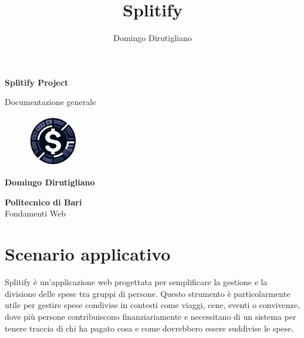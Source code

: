 \documentclass[11pt]{article}
\title{Splitify}
\author{Domingo Dirutigliano}
\begin{document}
\begin{titlepage}
   \begin{center}
       \vspace*{1cm}

       \LARGE{\textbf{Splitify Project}}

       \vspace{0.5cm}
        Documentazione generale

       \vspace{0.5cm}

       \begin{figure}[H]
    		\centering
    		\includegraphics[width=0.2\textwidth]{assets/logo.png}
		\end{figure}

       \vspace{0.5cm}

       \textbf{Domingo Dirutigliano}

       \vfill

       \textbf{Politecnico di Bari}\\
       Fondamenti Web

       \vspace{0.1cm}
   \end{center}
\end{titlepage}

\tableofcontents
\newpage
\section{Scenario applicativo}
Splitify è un'applicazione web progettata per semplificare la gestione e la divisione delle spese tra gruppi di persone. Questo strumento è particolarmente utile per gestire spese condivise in contesti come viaggi, cene, eventi o convivenze, dove più persone contribuiscono finanziariamente e necessitano di un sistema per tenere traccia di chi ha pagato cosa e come dovrebbero essere suddivise le spese.
\end{document}
